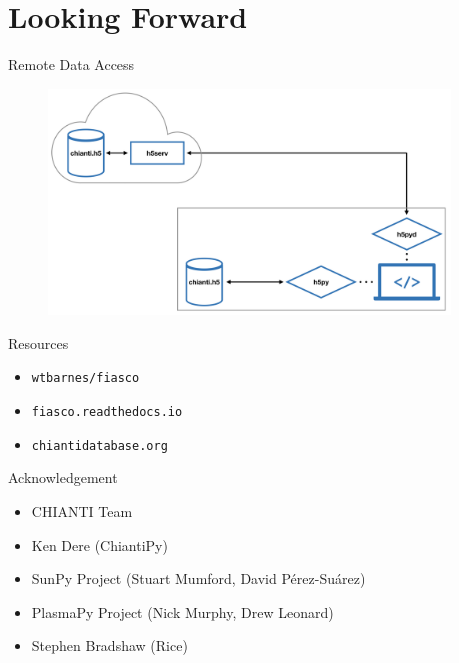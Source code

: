 \documentclass[12pt,aspectratio=169]{beamer}
\begin{document}
\section{Looking Forward}
\begin{frame}{Remote Data Access}
    \begin{figure}
        \centering
        \includegraphics[width=0.95\textwidth]{../figures/cloud_diagram.png}
    \end{figure}
\end{frame}
{%
\begin{frame}{Resources}
    \begin{itemize}
        \LARGE
        \item[] \texttt{wtbarnes/fiasco}
        \item[] \texttt{fiasco.readthedocs.io}
        \item[] \texttt{chiantidatabase.org}   
    \end{itemize}
\end{frame}
}
\begin{frame}{Acknowledgement}
    \begin{itemize}
        \item CHIANTI Team
        \item Ken Dere (ChiantiPy)
        \item SunPy Project (Stuart Mumford, David Pérez-Suárez)
        \item PlasmaPy Project (Nick Murphy, Drew Leonard)
        \item Stephen Bradshaw (Rice)
    \end{itemize}
\end{frame}
\end{document}
